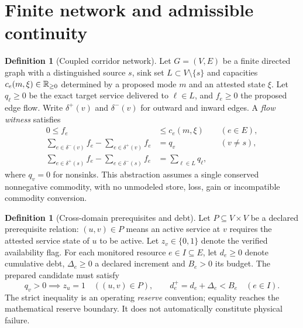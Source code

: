 \documentclass[11pt,letterpaper]{article}
\theoremstyle{definition}\newtheorem{definition}[theorem]{Definition}\newtheorem{example}[theorem]{Example}
\theoremstyle{remark}\newtheorem{remark}[theorem]{Remark}
\begin{document}
\section{Finite network and admissible continuity}
\begin{definition}[Coupled corridor network]\label{def:network}
Let $G=(V,E)$ be a finite directed graph with a distinguished source $s$, sink set $L\subset V\setminus\{s\}$ and capacities $c_e(m,\xi)\in\mathbb R_{\ge0}$ determined by a proposed mode $m$ and an attested state $\xi$. Let $q_\ell\ge0$ be the exact target service delivered to $\ell\in L$, and $f_e\ge0$ the proposed edge flow. Write $\delta^+(v)$ and $\delta^-(v)$ for outward and inward edges. A \emph{flow witness} satisfies
\begin{align}
0\le f_e &\le c_e(m,\xi) && (e\in E),\label{eq:cap}\\
\sum_{e\in\delta^-(v)}f_e-\sum_{e\in\delta^+(v)}f_e &= q_v &&(v\ne s),\label{eq:balance}\\
\sum_{e\in\delta^+(s)}f_e-\sum_{e\in\delta^-(s)}f_e &=\sum_{\ell\in L}q_\ell,\label{eq:source}
\end{align}
where $q_v=0$ for nonsinks. This abstraction assumes a single conserved nonnegative commodity, with no unmodeled store, loss, gain or incompatible commodity conversion.
\end{definition}
\begin{definition}[Cross-domain prerequisites and debt]\label{def:dependency}
Let $P\subseteq V\times V$ be a declared prerequisite relation: $(u,v)\in P$ means an active service at $v$ requires the attested service state of $u$ to be active. Let $z_v\in\{0,1\}$ denote the verified availability flag. For each monitored resource $e\in I\subseteq E$, let $d_e\ge0$ denote cumulative debt, $\Delta_e\ge0$ a declared increment and $B_e>0$ its budget. The prepared candidate must satisfy
\begin{equation}\label{eq:depdebt}
q_v>0\implies z_u=1\quad ((u,v)\in P),\qquad d_e^+=d_e+\Delta_e < B_e \quad (e\in I).
\end{equation}
The strict inequality is an operating \emph{reserve} convention; equality reaches the mathematical reserve boundary. It does not automatically constitute physical failure.
\end{definition}
\end{document}
